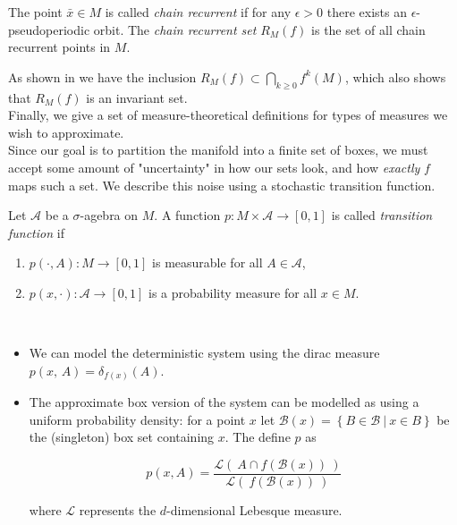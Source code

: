 \begin{definition}
    \cite*{dynbook} The point $\bar{x} \in M$ is called \emph{chain recurrent} if for any $\epsilon > 0$ 
    there exists an $\epsilon$-pseudoperiodic orbit. The \emph{chain recurrent set} $R_M(f)$ 
    is the set of all chain recurrent points in $M$.
\end{definition}

As shown in \cite*{algGAIO} we have the inclusion $R_M(f) \subset \bigcap_{k \geq 0} f^k(M)$,
which also shows that $R_M(f)$ is an invariant set. \\

Finally, we give a set of measure-theoretical definitions for types of measures we wish to 
approximate. \\

Since our goal is to partition the manifold into a finite set of boxes, we must accept some
amount of "uncertainty" in how our sets look, and how \emph{exactly} $f$ maps such a set.
We describe this noise using a stochastic transition function. 

\begin{definition}
    \cite*{attr} Let $\mathcal{A}$ be a $\sigma$-agebra on $M$. A function 
    $p : M \times \mathcal{A} \to [0,1]$ is called \emph{transition function} if

    \begin{enumerate}
        \item $p(\cdot, A) : M \to [0,1]$ is measurable for all $A \in \mathcal{A}$,
        \item $p(x, \cdot) : \mathcal{A} \to [0,1]$ is a probability measure for all $x \in M$.
    \end{enumerate}

\end{definition}

\begin{example}\
    
    \begin{itemize}
        \item\label{ex:q} \cite*{attr} We can model the deterministic system using the dirac 
        measure $p(x,\, A) = \delta_{f(x)}(A)$. 
        \item The approximate box version of the system can be modelled as using a uniform 
        probability density: for a point $x$ let 
        $\mathcal{B}(x) = \left\{ B \in \mathcal{B}\ \vert\ x \in B \right\}$ be the 
        (singleton) box set containing $x$. The define $p$ as 

        \begin{equation}
            p(x, A) = \frac{
                \mathcal{L} (\ A \cap f(\mathcal{B}(x))\ )
            }{
                \mathcal{L} (\ f(\mathcal{B}(x))\ )
            }
        \end{equation}

        where $\mathcal{L}$ represents the $d$-dimensional Lebesque measure.
    
    \end{itemize}

\end{example}

